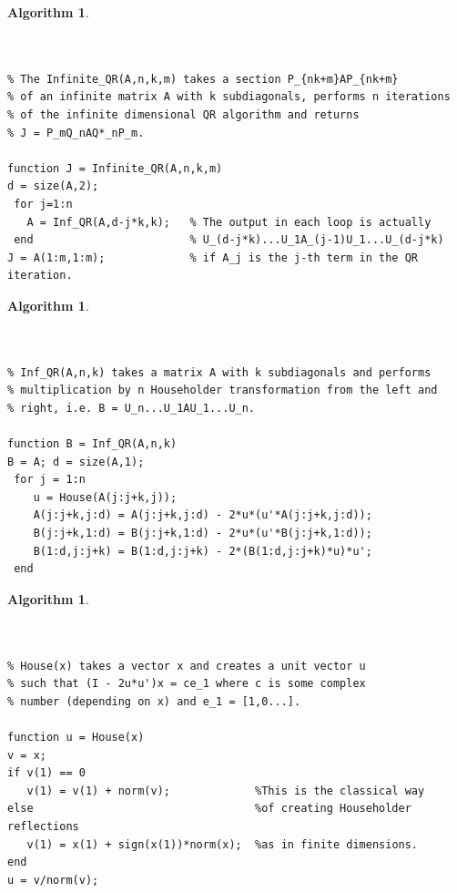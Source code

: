 \documentclass[a4paper,10pt]{article}
\newtheorem{algorithm}[theorem]{Algorithm}
\begin{document}
\begin{algorithm}\label{alg}
\footnotesize
\begin{verbatim}


% The Infinite_QR(A,n,k,m) takes a section P_{nk+m}AP_{nk+m} 
% of an infinite matrix A with k subdiagonals, performs n iterations 
% of the infinite dimensional QR algorithm and returns
% J = P_mQ_nAQ*_nP_m.   

function J = Infinite_QR(A,n,k,m)
d = size(A,2);
 for j=1:n
   A = Inf_QR(A,d-j*k,k);   % The output in each loop is actually
 end                        % U_(d-j*k)...U_1A_(j-1)U_1...U_(d-j*k)  
J = A(1:m,1:m);             % if A_j is the j-th term in the QR iteration. 
\end{verbatim}
\end{algorithm}

\begin{algorithm}
\footnotesize
\begin{verbatim}


% Inf_QR(A,n,k) takes a matrix A with k subdiagonals and performs 
% multiplication by n Householder transformation from the left and 
% right, i.e. B = U_n...U_1AU_1...U_n.

function B = Inf_QR(A,n,k)
B = A; d = size(A,1);
 for j = 1:n
    u = House(A(j:j+k,j));
    A(j:j+k,j:d) = A(j:j+k,j:d) - 2*u*(u'*A(j:j+k,j:d));
    B(j:j+k,1:d) = B(j:j+k,1:d) - 2*u*(u'*B(j:j+k,1:d));
    B(1:d,j:j+k) = B(1:d,j:j+k) - 2*(B(1:d,j:j+k)*u)*u';
 end 
\end{verbatim}
\end{algorithm}

\begin{algorithm}
\footnotesize
\begin{verbatim}


% House(x) takes a vector x and creates a unit vector u 
% such that (I - 2u*u')x = ce_1 where c is some complex 
% number (depending on x) and e_1 = [1,0...].

function u = House(x)
v = x;
if v(1) == 0
   v(1) = v(1) + norm(v);             %This is the classical way  
else                                  %of creating Householder reflections 
   v(1) = x(1) + sign(x(1))*norm(x);  %as in finite dimensions.
end
u = v/norm(v);
\end{verbatim}
\end{algorithm}
\normalsize
\end{document}
